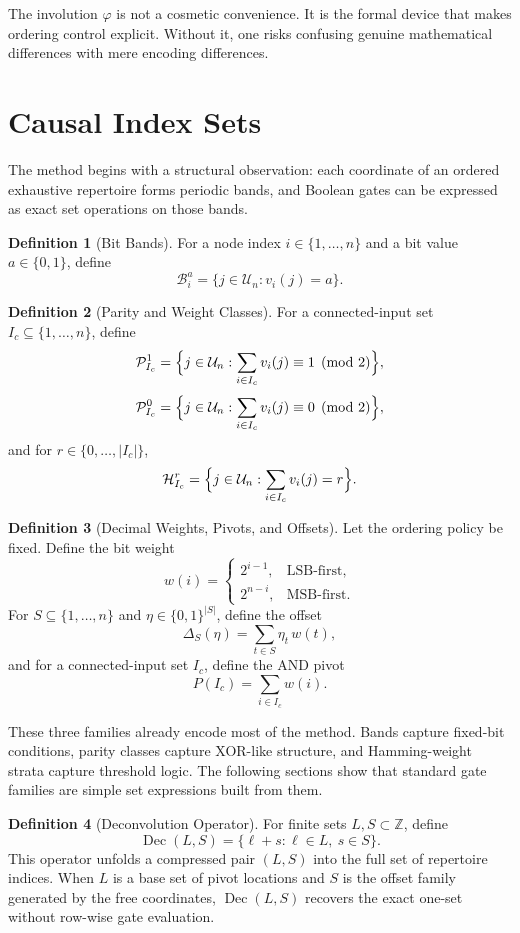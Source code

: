 \documentclass[11pt]{article}
\theoremstyle{definition}
\newtheorem{definition}{Definition}
\newcommand{\U}{\mathcal{U}_n}
\newcommand{\Ic}{I_c}
\newcommand{\Band}[2]{\mathcal{B}_{#1}^{#2}}
\newcommand{\Parity}[2]{\mathcal{P}_{#1}^{#2}}
\newcommand{\Weight}[2]{\mathcal{H}_{#1}^{#2}}
\newcommand{\bits}{\{0,1\}}
\begin{document}
The involution \(\varphi\) is not a cosmetic convenience. It is the formal device that makes ordering control explicit. Without it, one risks confusing genuine mathematical differences with mere encoding differences.

\section{Causal Index Sets}
The method begins with a structural observation: each coordinate of an ordered exhaustive repertoire forms periodic bands, and Boolean gates can be expressed as exact set operations on those bands.

\begin{definition}[Bit Bands]
For a node index \(i\in\{1,\dots,n\}\) and a bit value \(a\in\bits\), define
\[
\Band{i}{a}=\{j\in\U : v_i(j)=a\}.
\]
\end{definition}

\begin{definition}[Parity and Weight Classes]
For a connected-input set \(\Ic\subseteq\{1,\dots,n\}\), define
\[
\Parity{\Ic}{1}=\Bigl\{j\in\U : \sum_{i\in\Ic} v_i(j)\equiv 1 \pmod 2 \Bigr\},
\]
\[
\Parity{\Ic}{0}=\Bigl\{j\in\U : \sum_{i\in\Ic} v_i(j)\equiv 0 \pmod 2 \Bigr\},
\]
and for \(r\in\{0,\dots,|\Ic|\}\),
\[
\Weight{\Ic}{r}=\Bigl\{j\in\U : \sum_{i\in\Ic} v_i(j)=r \Bigr\}.
\]
\end{definition}

\begin{definition}[Decimal Weights, Pivots, and Offsets]
Let the ordering policy be fixed. Define the bit weight
\[
w(i)=
\begin{cases}
2^{i-1}, & \text{LSB-first},\\
2^{n-i}, & \text{MSB-first}.
\end{cases}
\]
For \(S\subseteq\{1,\dots,n\}\) and \(\eta\in\bits^{|S|}\), define the offset
\[
\Delta_S(\eta)=\sum_{t\in S}\eta_t\,w(t),
\]
and for a connected-input set \(\Ic\), define the AND pivot
\[
P(\Ic)=\sum_{i\in\Ic} w(i).
\]
\end{definition}

These three families already encode most of the method. Bands capture fixed-bit conditions,
parity classes capture XOR-like structure, and Hamming-weight strata capture threshold logic.
The following sections show that standard gate families are simple set expressions built from them.

\begin{definition}[Deconvolution Operator]
For finite sets \(L,S\subset\mathbb{Z}\), define
\[
\operatorname{Dec}(L,S)=\{\ell+s:\ell\in L,\ s\in S\}.
\]
This operator unfolds a compressed pair \((L,S)\) into the full set of repertoire indices.
When \(L\) is a base set of pivot locations and \(S\) is the offset family generated by the
free coordinates, \(\operatorname{Dec}(L,S)\) recovers the exact one-set without row-wise
gate evaluation.
\end{definition}
\end{document}
